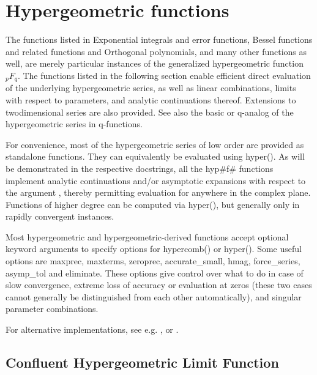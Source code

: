 \newpage
\chapter{Hypergeometric functions}
The functions listed in Exponential integrals and error functions, Bessel functions and related functions and Orthogonal polynomials, and many other functions as well, are merely particular instances of the generalized hypergeometric function ${}_pF_q$. The functions listed in
the following section enable efficient direct evaluation of the underlying hypergeometric series, as well as linear combinations, limits with respect to parameters, and analytic continuations thereof. Extensions to twodimensional series are also provided. See also the
basic or q-analog of the hypergeometric series in q-functions.

\vpara
For convenience, most of the hypergeometric series of low order are provided as standalone functions. They can equivalently be evaluated using hyper(). As will be demonstrated in the respective docstrings, all the hyp\#f\# functions implement analytic continuations and/or asymptotic expansions with respect to the argument , thereby permitting evaluation for anywhere in the complex plane. Functions of higher degree can be computed via hyper(), but generally only in rapidly convergent instances.

\vpara
Most hypergeometric and hypergeometric-derived functions accept optional keyword arguments to specify options for hypercomb() or hyper(). Some useful options are maxprec, maxterms, zeroprec, accurate\_small, hmag, force\_series, asymp\_tol and eliminate. These options give control over what to do in case of slow convergence, extreme loss of accuracy or evaluation at zeros (these two cases cannot generally be distinguished from each other automatically), and singular parameter combinations.

\vpara
For alternative implementations, see e.g. \cite{pearson_2009}, \cite{Muller_2001} or  \cite{Forrey_1997}.






\newpage

\section{Confluent Hypergeometric Limit Function}
\label{Hypergeometric0F1MpMath}




